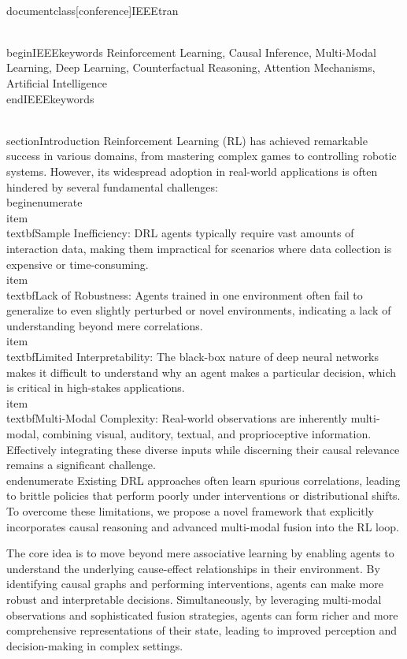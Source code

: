 \\documentclass[conference]{IEEEtran}
\begin{document}
\\begin{IEEEkeywords}
Reinforcement Learning, Causal Inference, Multi-Modal Learning, Deep Learning, Counterfactual Reasoning, Attention Mechanisms, Artificial Intelligence
\\end{IEEEkeywords}

\\section{Introduction}
Reinforcement Learning (RL) has achieved remarkable success in various domains, from mastering complex games to controlling robotic systems. However, its widespread adoption in real-world applications is often hindered by several fundamental challenges:
\\begin{enumerate}
    \\item \\textbf{Sample Inefficiency:} DRL agents typically require vast amounts of interaction data, making them impractical for scenarios where data collection is expensive or time-consuming.
    \\item \\textbf{Lack of Robustness:} Agents trained in one environment often fail to generalize to even slightly perturbed or novel environments, indicating a lack of understanding beyond mere correlations.
    \\item \\textbf{Limited Interpretability:} The black-box nature of deep neural networks makes it difficult to understand why an agent makes a particular decision, which is critical in high-stakes applications.
    \\item \\textbf{Multi-Modal Complexity:} Real-world observations are inherently multi-modal, combining visual, auditory, textual, and proprioceptive information. Effectively integrating these diverse inputs while discerning their causal relevance remains a significant challenge.
\\end{enumerate}
Existing DRL approaches often learn spurious correlations, leading to brittle policies that perform poorly under interventions or distributional shifts. To overcome these limitations, we propose a novel framework that explicitly incorporates causal reasoning and advanced multi-modal fusion into the RL loop.

The core idea is to move beyond mere associative learning by enabling agents to understand the underlying cause-effect relationships in their environment. By identifying causal graphs and performing interventions, agents can make more robust and interpretable decisions. Simultaneously, by leveraging multi-modal observations and sophisticated fusion strategies, agents can form richer and more comprehensive representations of their state, leading to improved perception and decision-making in complex settings.
\end{document}
